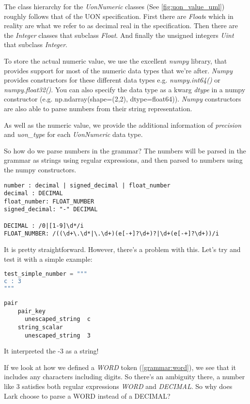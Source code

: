 \documentclass[12pt]{article}
\begin{document}
The class hierarchy for the \emph{UonNumeric} classes (See \ref{fig:uon_value_uml}) roughly follows that of the UON specification. First there are \emph{Float}s which in reality are what we refer to as decimal real in the specification. Then there are the \emph{Integer} classes that subclass \emph{Float}. And finally the unsigned integers \emph{Uint} that subclass \emph{Integer}. 

To store the actual numeric value, we use the excellent \emph{numpy} library, that provides support for most of the numeric data types that we're after. \emph{Numpy} provides constructors for these different data types e.g. \emph{numpy.int64()} or \emph{numpy.float32()}. You can also specify the data type as a kwarg \emph{dtype} in a numpy constructor (e.g. np.ndarray(shape=(2,2), dtype=float64)). \emph{Numpy} constructors are also able to parse numbers from their string representation.

As well as the numeric value, we provide the additional information of \emph{precision} and \emph{uon\_type} for each \emph{UonNumeric} data type.

So how do we parse numbers in the grammar? The numbers will be parsed in the grammar as strings using regular expressions, and then parsed to numbers using the numpy constructors.
\begin{lstlisting}
number : decimal | signed_decimal | float_number
decimal : DECIMAL
float_number: FLOAT_NUMBER
signed_decimal: "-" DECIMAL

DECIMAL : /0|[1-9]\d*/i
FLOAT_NUMBER: /((\d+\.\d*|\.\d+)(e[-+]?\d+)?|\d+(e[-+]?\d+))/i
\end{lstlisting}

It is pretty straightforward. However, there's a problem with this. Let's try and test it with a simple example:
\begin{lstlisting}[language=Python]
test_simple_number = """
c : 3
"""
\end{lstlisting}

\begin{lstlisting}
pair
    pair_key
      unescaped_string  c
    string_scalar
      unescaped_string  3
\end{lstlisting}

It interpreted the -3 as a string!

If we look at how we defined a \emph{WORD} token (\ref{grammar:word}), we see that it includes any characters including digits. So there's an ambiguity there, a number like 3 satisfies both regular expressions \emph{WORD} and \emph{DECIMAL}. So why does Lark choose to parse a WORD instead of a DECIMAL? 
\end{document}
